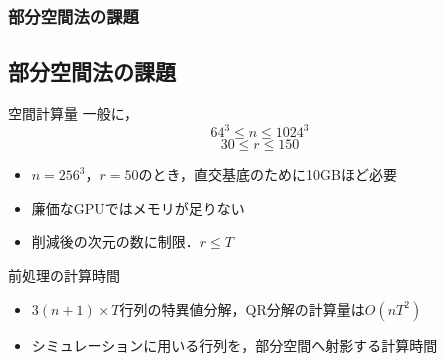 \documentclass[aspectratio=169,dvipdfmx,hyperref={bookmarks=true}]{beamer}
\begin{document}


\begin{frame}
\frametitle{部分空間法の課題}
\subsection{部分空間法の課題}
	\begin{block}{空間計算量}
		一般に，
		\[64^3 \le n \le 1024^3\]
		\[30 \le r \le 150\]
   		\begin{itemize}
			\item $n = 256^3$，$r=50$のとき，直交基底のために10GBほど必要
			\item 廉価なGPUではメモリが足りない
   			\item 削減後の次元の数に制限．$r \le T$
		\end{itemize}
	\end{block}

	\begin{block}{前処理の計算時間}
 		\begin{itemize}
		\item $3(n +1)\times T$行列の特異値分解，QR分解の計算量は$O(nT^2)$
		\item	シミュレーションに用いる行列を，部分空間へ射影する計算時間
	\end{itemize}
	\end{block}
\end{frame}

\end{document}
